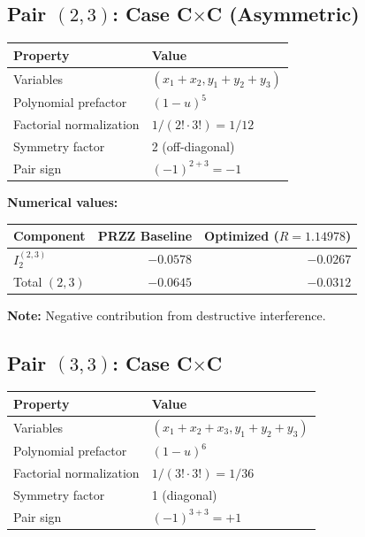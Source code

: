 \documentclass[11pt]{article}
\begin{document}
\subsection{Pair $(2,3)$: Case C$\times$C (Asymmetric)}

\begin{center}
\begin{tabular}{ll}
\toprule
Property & Value \\
\midrule
Variables & $(x_1+x_2, y_1+y_2+y_3)$ \\
Polynomial prefactor & $(1-u)^5$ \\
Factorial normalization & $1/(2! \cdot 3!) = 1/12$ \\
Symmetry factor & 2 (off-diagonal) \\
Pair sign & $(-1)^{2+3} = -1$ \\
\bottomrule
\end{tabular}
\end{center}

\textbf{Numerical values:}

\begin{center}
\begin{tabular}{lrr}
\toprule
Component & PRZZ Baseline & Optimized ($R=1.14978$) \\
\midrule
$I_2^{(2,3)}$ & $-0.0578$ & $-0.0267$ \\
Total $(2,3)$ & $-0.0645$ & $-0.0312$ \\
\bottomrule
\end{tabular}
\end{center}

\textbf{Note:} Negative contribution from destructive interference.

\subsection{Pair $(3,3)$: Case C$\times$C}

\begin{center}
\begin{tabular}{ll}
\toprule
Property & Value \\
\midrule
Variables & $(x_1+x_2+x_3, y_1+y_2+y_3)$ \\
Polynomial prefactor & $(1-u)^6$ \\
Factorial normalization & $1/(3! \cdot 3!) = 1/36$ \\
Symmetry factor & 1 (diagonal) \\
Pair sign & $(-1)^{3+3} = +1$ \\
\bottomrule
\end{tabular}
\end{center}
\end{document}
